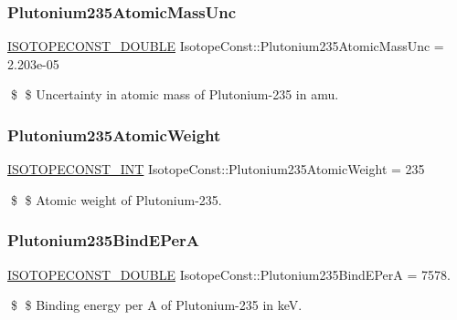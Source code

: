 \subsubsection{\texorpdfstring{Plutonium235\+Atomic\+Mass\+Unc}{Plutonium235AtomicMassUnc}}
{\footnotesize\ttfamily \mbox{\hyperlink{group___isotope_const-_macros_ga8f45a7272ce02c0b4c65c44636ed719a}{I\+S\+O\+T\+O\+P\+E\+C\+O\+N\+S\+T\+\_\+\+D\+O\+U\+B\+LE}} Isotope\+Const\+::\+Plutonium235\+Atomic\+Mass\+Unc = 2.\+203e-\/05}

\$ \$ Uncertainty in atomic mass of Plutonium-\/235 in amu. \mbox{\label{group___isotope_const-_plutonium-_pu235_gad1fafe899ae657ad963918d2a53c4c17}} 
\subsubsection{\texorpdfstring{Plutonium235\+Atomic\+Weight}{Plutonium235AtomicWeight}}
{\footnotesize\ttfamily \mbox{\hyperlink{group___isotope_const-_macros_ga5f18360b3e99483a35c32d789e62621c}{I\+S\+O\+T\+O\+P\+E\+C\+O\+N\+S\+T\+\_\+\+I\+NT}} Isotope\+Const\+::\+Plutonium235\+Atomic\+Weight = 235}

\$ \$ Atomic weight of Plutonium-\/235. \mbox{\label{group___isotope_const-_plutonium-_pu235_gaecd4240edf1f2e29e19ec6f9a5d71bd6}} 
\subsubsection{\texorpdfstring{Plutonium235\+Bind\+E\+PerA}{Plutonium235BindEPerA}}
{\footnotesize\ttfamily \mbox{\hyperlink{group___isotope_const-_macros_ga8f45a7272ce02c0b4c65c44636ed719a}{I\+S\+O\+T\+O\+P\+E\+C\+O\+N\+S\+T\+\_\+\+D\+O\+U\+B\+LE}} Isotope\+Const\+::\+Plutonium235\+Bind\+E\+PerA = 7578.}

\$ \$ Binding energy per A of Plutonium-\/235 in keV. \mbox{\label{group___isotope_const-_plutonium-_pu235_ga57d3c049780cd4349b67365d0b839702}} 
